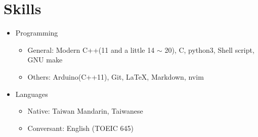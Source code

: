 \section{Skills}
\begin{itemize}
	\item Programming
	\begin{itemize}
		\item General: Modern C++(11 and a little 14 $\sim$ 20), C, python3, Shell script, GNU make
		\item Others: Arduino(C++11), Git, \LaTeX , Markdown, nvim
	\end{itemize}
	\item Languages
	\begin{itemize}
		\item Native: Taiwan Mandarin, Taiwanese
		\item Conversant: English (TOEIC 645)
	\end{itemize}
\end{itemize}